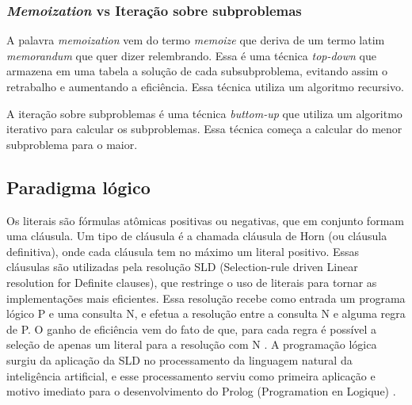 \subsubsection{\textit{Memoization} vs Iteração sobre subproblemas} 
A palavra \textit{memoization} vem do termo \textit{memoize} que deriva de um termo latim \textit{memorandum} que quer dizer relembrando. Essa é uma técnica \textit{top-down} que  armazena em uma tabela a solução de cada subsubproblema, evitando assim o retrabalho e aumentando a eficiência. Essa técnica utiliza um algoritmo recursivo.

A iteração sobre subproblemas é uma técnica \textit{buttom-up} que utiliza um algoritmo iterativo para calcular os subproblemas. Essa técnica começa a calcular do menor subproblema para o maior. 

\subsection{Paradigma lógico}
Os literais são fórmulas atômicas positivas ou negativas, que em conjunto formam uma cláusula. Um tipo de cláusula é a chamada cláusula de Horn (ou cláusula definitiva), onde cada cláusula tem no máximo um literal positivo. Essas cláusulas são utilizadas pela resolução SLD (Selection-rule driven Linear resolution for Definite clauses), que restringe o uso de literais para tornar as implementações mais eficientes. Essa resolução recebe como entrada um programa lógico P e uma consulta N, e efetua a resolução entre a consulta N e alguma regra de P. O ganho de eficiência vem do fato de que, para cada regra é possível a seleção de apenas um literal para a resolução com N \cite{rodrigues2010fundamentos}.
A programação lógica surgiu da aplicação da SLD no processamento da linguagem natural da  inteligência artificial, e esse processamento serviu como primeira aplicação e motivo imediato para o desenvolvimento do Prolog (Programation en Logique) \cite{rodrigues2010fundamentos}.
